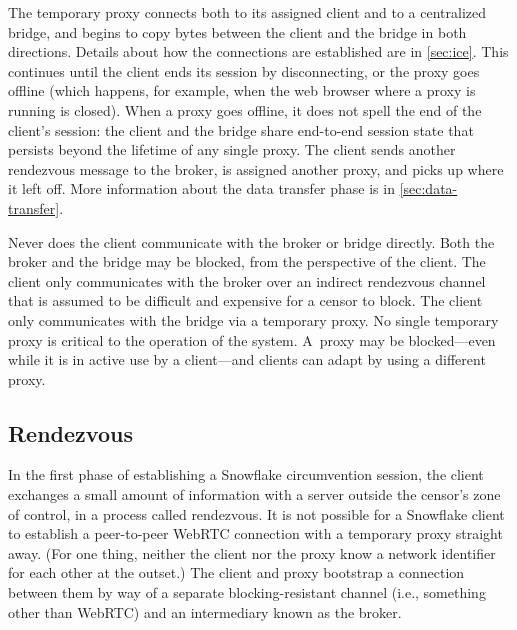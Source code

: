 \documentclass[letterpaper,twocolumn]{article}
\begin{document}
The temporary proxy connects both to its assigned client
and to a centralized bridge,
and begins to copy bytes between the client and the bridge
in both directions.
Details about how the connections are established are in \autoref{sec:ice}.
This continues until the client ends its session by disconnecting,
or the proxy goes offline
(which happens, for example, when the web browser where a proxy is running is closed).
When a proxy goes offline,
it does not spell the end of the client's session:
the client and the bridge share end-to-end session state
that persists beyond the lifetime of any single proxy.
The client sends another rendezvous message to the broker,
is assigned another proxy,
and picks up where it left off.
More information about the data transfer phase is in \autoref{sec:data-transfer}.

Never does the client communicate with the broker or bridge directly.
Both the broker and the bridge may be blocked,
from the perspective of the client.
The client only communicates with the broker over an indirect rendezvous channel
that is assumed to be difficult and expensive for a censor to block.
The client only communicates with the bridge via a temporary proxy.
No single temporary proxy is critical to the operation of the system.
A~proxy may be blocked---even while it is in active use by a client---and
clients can adapt by using a different proxy.

\subsection{Rendezvous}
\label{sec:rendezvous}

In the first phase of establishing a Snowflake circumvention session,
the client exchanges a small amount of information with a server
outside the censor's zone of control,
in a process called rendezvous.
It is not possible for a Snowflake client
to establish a peer-to-peer WebRTC connection
with a temporary proxy straight away.
(For one thing, neither the client nor the proxy
know a network identifier for each other at the outset.)
The client and proxy bootstrap a connection between them
by way of a separate blocking-resistant channel
(i.e., something other than WebRTC)
and an intermediary known as the broker.
\end{document}
